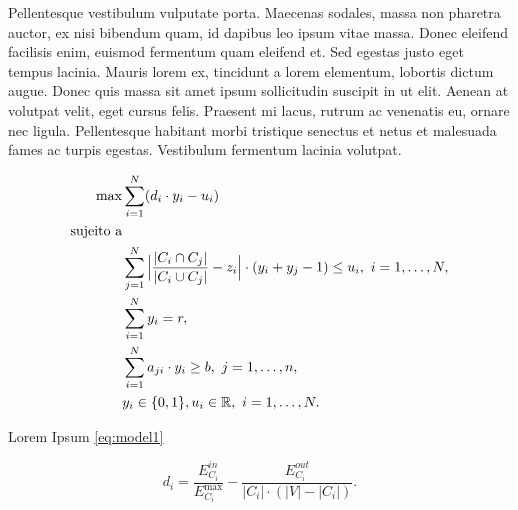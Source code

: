 \documentclass[superscriptaddress,a0]{sciposter}
\begin{document}
\begin{multicols}{3}
Pellentesque vestibulum vulputate porta. Maecenas sodales, massa non pharetra auctor, ex nisi bibendum quam, id dapibus leo ipsum vitae massa. Donec eleifend facilisis enim, euismod fermentum quam eleifend et. Sed egestas justo eget tempus lacinia. Mauris lorem ex, tincidunt a lorem elementum, lobortis dictum augue. Donec quis massa sit amet ipsum sollicitudin suscipit in ut elit. Aenean at volutpat velit, eget cursus felis. Praesent mi lacus, rutrum ac venenatis eu, ornare nec ligula. Pellentesque habitant morbi tristique senectus et netus et malesuada fames ac turpis egestas. Vestibulum fermentum lacinia volutpat.

\begin{subequations}\allowdisplaybreaks
  \label{eq:model1}
  \begin{align}
    \max & \sum\limits_{i = 1}^N (d_i \cdot y_i - u_i) \label{eq:ocm1:of}\\
    \text{sujeito a} & \nonumber \\
    & \sum\limits_{j = 1}^N \Big|\frac{|C_i \cap C_j|}{|C_i \cup C_j|} -
      z_i\Big| \cdot (y_i + y_j - 1) \leq u_i, \ i = 1, \dots, N,
      \label{eq:ocm1:cons1} \\
    & \sum\limits_{i = 1}^N y_i = r, \label{eq:ocm1:cons2} \\
    & \sum\limits_{i = 1}^N a_{ji} \cdot y_i \geq b, \ j = 1, \dots,
      n, \label{eq:ocm1:cons3} \\
    & y_i \in \{0, 1\}, u_i \in \mathbb{R}, \ i = 1, \dots, N.
      \label{eq:ocm1:cons4}
  \end{align}
\end{subequations}

    Lorem Ipsum \ref{eq:model1}

    \begin{equation}
    \label{eq:clst_goodness}
    d_i = \frac{E_{C_i}^{in}}{E_{C_i}^{\max}} -
        \frac{E_{C_i}^{out}}{|C_i| \cdot (|V| - |C_i|)}.
    \end{equation}


\end{multicols}
\end{document}
